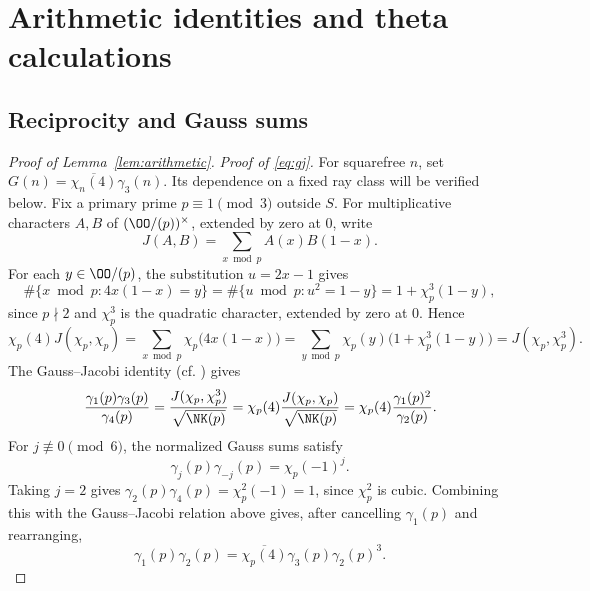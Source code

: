 \appendix
\section{Arithmetic identities and theta calculations}\label{sec:arithmetic}

\subsection{Reciprocity and Gauss sums}\label{app:gauss-identities}

\begin{proof}[Proof of Lemma~\ref{lem:arithmetic}]
\par\noindent\textit{Proof of \eqref{eq:gj}.}\quad
For squarefree $n$, set $G(n)=\overline{\chi_n(4)}\gamma_3(n)$.
Its dependence on a fixed ray class will be verified below.
Fix a primary prime $p\equiv1\pmod3$ outside $S$. For multiplicative characters $A,B$ of $(\OO/(p))^\times$,
extended by zero at $0$, write
\[
J(A,B)=\sum_{x\bmod p}A(x)B(1-x).
\]
For each $y\in\OO/(p)$, the substitution $u=2x-1$ gives
\[
 \#\{x\bmod p:4x(1-x)=y\} =\#\{u\bmod p:u^2=1-y\} =1+\chi_p^3(1-y),
\]
since $p\nmid2$ and $\chi_p^3$ is the quadratic character, extended
by zero at $0$. Hence
\[
 \chi_p(4)J(\chi_p,\chi_p) =\sum_{x\bmod p}\chi_p\bigl(4x(1-x)\bigr) =\sum_{y\bmod p}\chi_p(y)\bigl(1+\chi_p^3(1-y)\bigr) =J(\chi_p,\chi_p^3).
\]
The Gauss--Jacobi identity (cf. \cite[(3.18)]{IK04}) gives
\[
 \frac{\gamma_1(p)\gamma_3(p)}{\gamma_4(p)}
 =\frac{J(\chi_p,\chi_p^3)}{\sqrt{\NK(p)}}
 =\chi_p(4)\frac{J(\chi_p,\chi_p)}{\sqrt{\NK(p)}}
 =\chi_p(4)\frac{\gamma_1(p)^2}{\gamma_2(p)}.
\]
For $j\not\equiv0\pmod6$, the normalized Gauss sums satisfy
\[
 \gamma_j(p)\gamma_{-j}(p)=\chi_p(-1)^j.
\]
Taking $j=2$ gives $\gamma_2(p)\gamma_4(p)=\chi_p^2(-1)=1$,
since $\chi_p^2$ is cubic.
Combining this with the Gauss--Jacobi relation above gives, after
cancelling $\gamma_1(p)$ and rearranging,
\[
\gamma_1(p)\gamma_2(p)=\overline{\chi_p(4)}\gamma_3(p)\gamma_2(p)^3.
\]


\end{proof}
